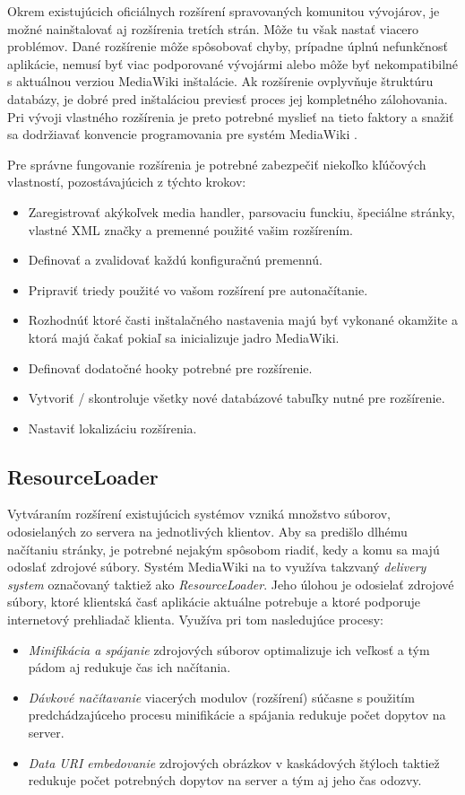 Okrem existujúcich oficiálnych rozšírení spravovaných komunitou vývojárov, je možné nainštalovať aj rozšírenia tretích strán. Môže tu však nastať viacero problémov. Dané rozšírenie môže spôsobovať chyby, prípadne úplnú nefunkčnosť aplikácie, nemusí byť viac podporované vývojármi alebo môže byť nekompatibilné s aktuálnou verziou MediaWiki inštalácie. Ak rozšírenie ovplyvňuje štruktúru databázy, je dobré pred inštaláciou previesť proces jej kompletného zálohovania. Pri vývoji vlastného rozšírenia je preto potrebné myslieť na tieto faktory a snažiť sa dodržiavať konvencie programovania pre systém MediaWiki \cite{MediaWikiConventions}. 

Pre správne fungovanie rozšírenia je potrebné zabezpečiť niekoľko kľúčových vlastností, pozostávajúcich z týchto krokov:
\begin{itemize}
	\item Zaregistrovať akýkoľvek media handler, parsovaciu funckiu, špeciálne stránky, vlastné XML značky a premenné použité vašim rozšírením.
	\item Definovať a zvalidovať každú konfiguračnú premennú.
	\item Pripraviť triedy použité vo vašom rozšírení pre autonačítanie.
	\item Rozhodnúť ktoré časti inštalačného nastavenia majú byť vykonané okamžite a ktorá majú čakať pokiaľ sa inicializuje jadro MediaWiki.
	\item Definovať dodatočné hooky potrebné pre rozšírenie.
	\item Vytvoriť / skontroluje všetky nové databázové tabuľky nutné pre rozšírenie.
	\item Nastaviť lokalizáciu rozšírenia.
\end{itemize}

\subsection{ResourceLoader}
Vytváraním rozšírení existujúcich systémov vzniká množstvo súborov, odosielaných zo servera na jednotlivých klientov. Aby sa predišlo dlhému načítaniu stránky, je potrebné nejakým spôsobom riadiť, kedy a komu sa majú odoslať zdrojové súbory. Systém MediaWiki na to využíva takzvaný \textit{delivery system} označovaný taktiež ako \textit{ResourceLoader}. Jeho úlohou je odosielať zdrojové súbory, ktoré klientská časť aplikácie aktuálne potrebuje a ktoré podporuje internetový prehliadač klienta. Využíva pri tom nasledujúce procesy:

\begin{itemize}
	\item \textit{Minifikácia a spájanie} zdrojových súborov optimalizuje ich veľkosť a tým pádom aj redukuje čas ich načítania.
	\item \textit{Dávkové načítavanie} viacerých modulov (rozšírení) súčasne s použitím predchádzajúceho procesu minifikácie a spájania redukuje počet dopytov na server.
	\item \textit{Data URI embedovanie} zdrojových obrázkov v kaskádových štýloch taktiež redukuje počet potrebných dopytov na server a tým aj jeho čas odozvy.
\end{itemize}